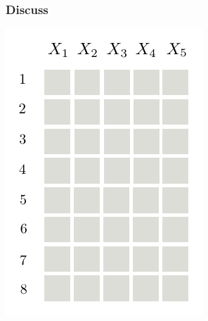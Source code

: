 \documentclass[xcolor={usenames,dvipsnames,svgnames}, compress]{beamer}
\begin{document}
\begin{frame}
  \frametitle{Discuss}
  \begin{minipage}[t][][t]{1.5309cm}
    \includegraphics[width=\linewidth]{figures/grid-0}
  \end{minipage}\hspace{10pt}\begin{minipage}[t]{1.3462cm}

\end{minipage}
\end{frame}
\end{document}
